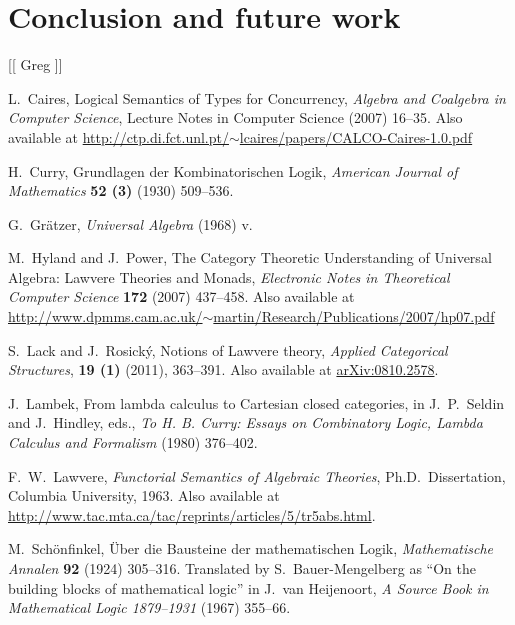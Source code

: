 \documentclass{llncs}
\begin{document}
\section{Conclusion and future work}
[[ Greg ]]

\begin{thebibliography}{99}
\newcommand{\arxiv}[1]{\href{http://arxiv.org/abs/#1}{{arXiv:#1}}}

 L.\ Caires, Logical Semantics of Types for Concurrency, {\em Algebra and Coalgebra in Computer Science}, Lecture Notes in Computer Science (2007) 16--35.  Also available at \href{http://ctp.di.fct.unl.pt/~lcaires/papers/CALCO-Caires-1.0.pdf}{http://ctp.di.fct.unl.pt/$\sim$lcaires/papers/CALCO-Caires-1.0.pdf}

 H.\ Curry, Grundlagen der Kombinatorischen Logik, {\em American Journal of Mathematics} {\bf 52 (3)} (1930) 509--536.

 G.\ Gr\"atzer, {\em Universal Algebra} (1968) v.

 M.\ Hyland and J.\ Power, The Category Theoretic Understanding of Universal Algebra: Lawvere Theories and Monads, {\em Electronic Notes in Theoretical Computer Science} {\bf 172} (2007) 437--458.  Also available at\\
\href{http://www.dpmms.cam.ac.uk/~martin/Research/Publications/2007/hp07.pdf}{http://www.dpmms.cam.ac.uk/$\sim$martin/Research/Publications/2007/hp07.pdf}

 S.\ Lack and J.\ Rosick\'y, Notions of Lawvere theory, {\em Applied Categorical Structures}, {\bf 19 (1)} (2011), 363--391.  Also available at \arxiv{0810.2578}.

 J.\ Lambek, From lambda calculus to Cartesian closed categories, in J.\ P.\ Seldin and J.\ Hindley, eds., {\em To H. B. Curry: Essays on Combinatory Logic, Lambda Calculus and Formalism} (1980) 376--402.

 F.\ W.\ Lawvere, {\sl Functorial Semantics of Algebraic Theories}, Ph.D.\ Dissertation, Columbia University, 1963. Also available at \\
\href{http://www.tac.mta.ca/tac/reprints/articles/5/tr5abs.html}{http://www.tac.mta.ca/tac/reprints/articles/5/tr5abs.html}.

 M.\ Sch\"onfinkel, \"Uber die Bausteine der mathematischen Logik, {\em Mathematische Annalen} {\bf 92} (1924) 305--316. Translated by S.\ Bauer-Mengelberg as ``On the building blocks of mathematical logic'' in J.\ van Heijenoort, {\em A Source Book in Mathematical Logic 1879–1931} (1967) 355--66.


\end{thebibliography}
\end{document}
